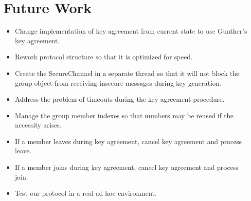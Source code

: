 \documentclass[12pt]{article}
\begin{document}
    \section{Future Work}
    \label{xref:future_work}
      \begin{itemize}
    	    \item   Change implementation of key agreement from current state
	    	    to use Gunther's key agreement. 
	    \item   Rework protocol structure so that it is optimized for speed.
	    \item   Create the SecureChannel in a separate thread so that it
	    	    will not block the group object from receiving insecure 
		    messages during key generation.
	    \item   Address the problem of timeouts during the key agreement
	    	    procedure.
	    \item   Manage the group member indexes so that numbers may be 
		    reused if the necessity arises.
	    \item   If a member leaves during key agreement, cancel key 
		    agreement and process leave.
	    \item   If a member joins during key agreement, cancel key agreement
		    and process join.
	    \item   Test our protocol in a real ad hoc environment.
      \end{itemize}
\end{document}

